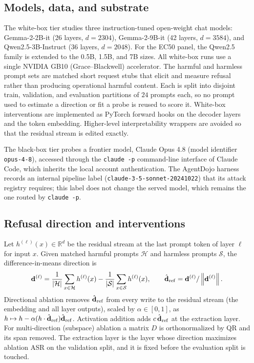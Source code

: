 \subsection{Models, data, and substrate}
The white-box tier studies three instruction-tuned open-weight chat models:
Gemma-2-2B-it (26 layers, $d=2304$), Gemma-2-9B-it (42 layers, $d=3584$), and
Qwen2.5-3B-Instruct (36 layers, $d=2048$). For the EC50 panel, the Qwen2.5 family is
extended to the 0.5B, 1.5B, and 7B sizes. All white-box runs use a single NVIDIA GB10
(Grace--Blackwell) accelerator. The harmful and harmless prompt sets are matched
short request stubs that elicit and measure refusal rather than producing operational
harmful content. Each is split into disjoint train, validation, and evaluation
partitions of $24$ prompts each, so no prompt used to estimate a direction or fit a
probe is reused to score it. White-box interventions are implemented as PyTorch
forward hooks on the decoder layers and the token embedding. Higher-level
interpretability wrappers are avoided so that the residual stream is edited exactly.

The black-box tier probes a frontier model, Claude Opus 4.8 (model identifier
\texttt{opus-4-8}), accessed through the \texttt{claude -p} command-line interface of
Claude Code, which inherits the local account authentication. The AgentDojo harness
records an internal pipeline label (\texttt{claude-3-5-sonnet-20241022}) that its
attack registry requires; this label does not change the served model, which remains
the one routed by \texttt{claude -p}.

\subsection{Refusal direction and interventions}
Let $h^{(\ell)}(x)\in\mathbb{R}^d$ be the residual stream at the last prompt token of
layer $\ell$ for input $x$. Given matched harmful prompts $\mathcal{H}$ and harmless
prompts $\mathcal{S}$, the difference-in-means direction is
\begin{equation}
\mathbf{d}^{(\ell)} = \frac{1}{|\mathcal{H}|}\sum_{x\in\mathcal{H}} h^{(\ell)}(x)
- \frac{1}{|\mathcal{S}|}\sum_{x\in\mathcal{S}} h^{(\ell)}(x),
\qquad \hat{\mathbf{d}}_{\mathrm{ref}} = \mathbf{d}^{(\ell)}/\left\|\mathbf{d}^{(\ell)}\right\|.
\end{equation}
Directional ablation removes $\hat{\mathbf{d}}_{\mathrm{ref}}$ from every write to the residual stream (the
embedding and all layer outputs), scaled by $\alpha\in[0,1]$, as
$h \mapsto h - \alpha (h\cdot\hat{\mathbf{d}}_{\mathrm{ref}})\hat{\mathbf{d}}_{\mathrm{ref}}$. Activation addition adds $c\,\hat{\mathbf{d}}_{\mathrm{ref}}$ at the
extraction layer. For multi-direction (subspace) ablation a matrix $D$ is
orthonormalized by QR and its span removed. The extraction layer is the layer whose
direction maximizes ablation ASR on the validation split, and it is fixed before the
evaluation split is touched.

